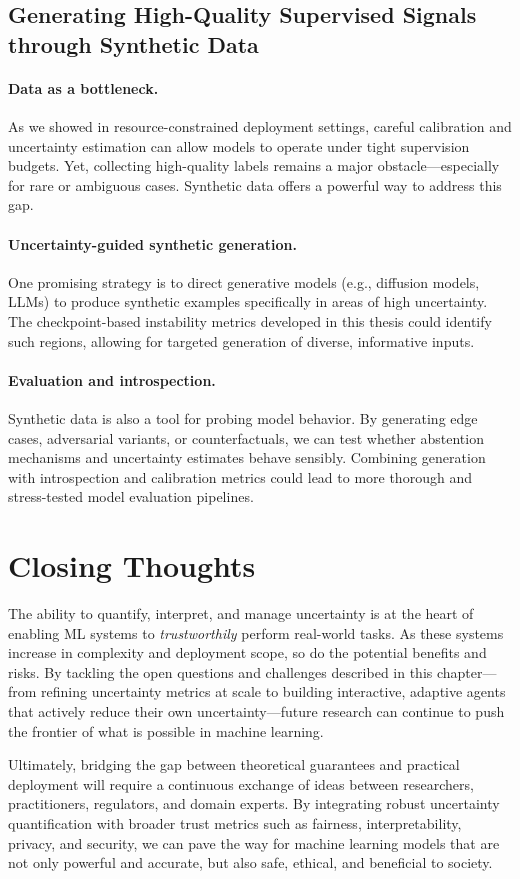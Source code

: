 \subsection{Generating High-Quality Supervised Signals through Synthetic Data}

\paragraph{Data as a bottleneck.} As we showed in resource-constrained deployment settings, careful calibration and uncertainty estimation can allow models to operate under tight supervision budgets. Yet, collecting high-quality labels remains a major obstacle—especially for rare or ambiguous cases. Synthetic data offers a powerful way to address this gap.

\paragraph{Uncertainty-guided synthetic generation.} One promising strategy is to direct generative models (e.g., diffusion models, LLMs) to produce synthetic examples specifically in areas of high uncertainty. The checkpoint-based instability metrics developed in this thesis could identify such regions, allowing for targeted generation of diverse, informative inputs.

\paragraph{Evaluation and introspection.} Synthetic data is also a tool for probing model behavior. By generating edge cases, adversarial variants, or counterfactuals, we can test whether abstention mechanisms and uncertainty estimates behave sensibly. Combining generation with introspection and calibration metrics could lead to more thorough and stress-tested model evaluation pipelines.

\section{Closing Thoughts}

The ability to quantify, interpret, and manage uncertainty is at the heart of enabling ML systems to \emph{trustworthily} perform real-world tasks. As these systems increase in complexity and deployment scope, so do the potential benefits and risks. By tackling the open questions and challenges described in this chapter—from refining uncertainty metrics at scale to building interactive, adaptive agents that actively reduce their own uncertainty—future research can continue to push the frontier of what is possible in machine learning.

Ultimately, bridging the gap between theoretical guarantees and practical deployment will require a continuous exchange of ideas between researchers, practitioners, regulators, and domain experts. By integrating robust uncertainty quantification with broader trust metrics such as fairness, interpretability, privacy, and security, we can pave the way for machine learning models that are not only powerful and accurate, but also safe, ethical, and beneficial to society.
